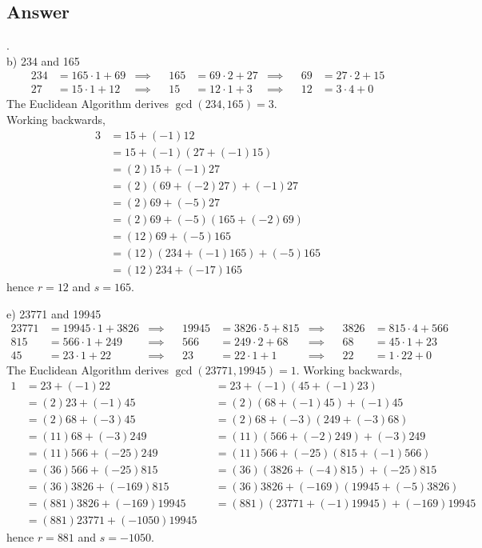 \documentclass[
	12pt, %
]{fphw}
\begin{document}
\subsection*{Answer} .\\
b) 234 and 165
\begin{align*}
234 &= 165 \cdot 1 + 69 &\implies& &165 &= 69 \cdot 2 + 27 &\implies& &69 &= 27 \cdot 2 + 15 \\
27 &= 15 \cdot 1 + 12 &\implies& &15 &= 12 \cdot 1 + 3 &\implies&&12 &= 3 \cdot 4 + 0
\end{align*}
The Euclidean Algorithm derives $\gcd (234,165) = 3$. \\
Working backwards,
\begin{align*}
3 &= 15 + (-1)12\\
&= 15 + (-1)(27 + (-1)15)\\
&= (2)15 + (-1)27\\
&= (2)(69 + (-2)27) + (-1)27\\
&= (2)69 + (-5)27\\
&= (2)69 + (-5)(165 + (-2)69)\\
&= (12)69 + (-5)165\\
&= (12)(234 + (-1)165) + (-5)165\\
&= (12)234 + (-17)165
\end{align*}
hence $r = 12$ and $s = 165$.

\vspace{15 pt}
\noindent
e) 23771 and 19945
\begin{align*}
23771 &= 19945 \cdot 1 + 3826 &\implies& &19945 &= 3826 \cdot  5 + 815 &\implies& &3826&= 815 \cdot 4 + 566\\
815 &= 566 \cdot 1 + 249 &\implies& &566 &= 249 \cdot 2 + 68 &\implies& &68 &= 45 \cdot 1 + 23\\
45 &= 23 \cdot 1 + 22 &\implies& &23 &= 22 \cdot 1 + 1 &\implies& &22 &= 1 \cdot 22 + 0
\end{align*}
The Euclidean Algorithm derives $\gcd (23771, 19945) = 1$.
Working backwards,
\begin{align*}
1 &= 23 + (-1)22 &&= 23 + (-1)(45+(-1)23)\\
&=(2)23 + (-1)45 &&= (2)(68 + (-1)45) + (-1)45\\
&=(2)68 + (-3)45 &&= (2)68 + (-3)(249 + (-3)68)\\
&=(11)68 + (-3)249 &&= (11)(566+(-2)249) + (-3)249\\
&=(11)566 + (-25)249 &&= (11)566 + (-25)(815 +(-1)566)\\
&=(36)566 + (-25)815 &&= (36)(3826 + (-4)815) + (-25)815\\
&=(36)3826 + (-169)815 &&=(36)3826 + (-169)(19945 + (-5)3826)\\
&=(881)3826 + (-169)19945 &&= (881)(23771 + (-1)19945) + (-169)19945\\
&=(881)23771 + (-1050)19945
\end{align*}
hence $r = 881$ and $s = -1050$.
\end{document}
